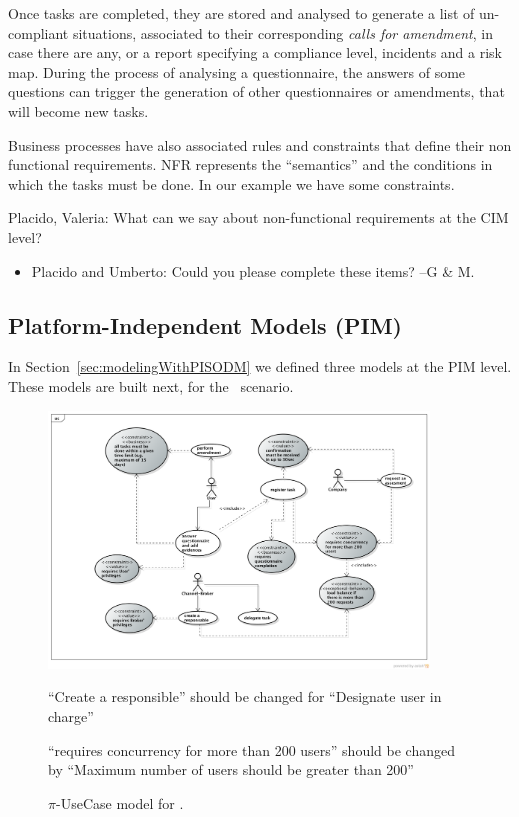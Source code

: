 Once tasks are completed, they are stored and analysed to generate a list of un-compliant situations, associated to their corresponding \textit{calls for amendment}, in case there are any, or a report specifying a compliance level, incidents and a risk map.
During the process of analysing a questionnaire, the answers of some questions can trigger the generation of other questionnaires or amendments, that will become new tasks.  

Business processes have also associated rules and constraints that define their non functional requirements.
NFR represents the ``semantics'' and the conditions in which the tasks must be done.
In our example we have some constraints.

{\color{red}
Placido, Valeria: What can we say about non-functional requirements at the CIM level?
}



\begin{itemize}
\item {\color{magenta} Placido and Umberto: Could you please complete these items? --G \& M.}
\end{itemize}




\subsection{Platform-Independent Models (PIM)}

In Section~\ref{sec:modelingWithPISODM} we defined three models at the PIM level.
These models are built next, for the \FlyingPig\ scenario.

\begin{figure}[t]
\centering
\includegraphics[width=0.9\textwidth]{figs/UseCaseGeneral.png}

{\color{red} 
``Create a responsible'' should be changed for ``Designate user in charge''

``requires concurrency for more than 200 users'' should be changed by ``Maximum number of users should be greater than 200''
}
\caption{$\pi$-UseCase model for \FlyingPig.\label{fig:piUseCaseModel}}
\end{figure}


